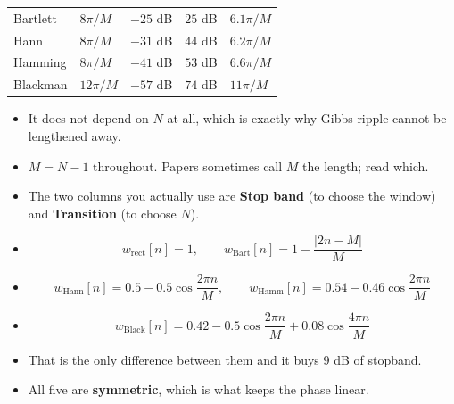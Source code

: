 {\begin{tabular}{@{}L{2.0cm}L{1.4cm}L{1.3cm}L{1.3cm}L{1.5cm}@{}}
Bartlett & $8\pi/M$ & $-25$ dB & $25$ dB & $6.1\pi/M$ \\
Hann & $8\pi/M$ & $-31$ dB & $44$ dB & $6.2\pi/M$ \\
Hamming & $8\pi/M$ & $-41$ dB & $53$ dB & $6.6\pi/M$ \\
Blackman & $12\pi/M$ & $-57$ dB & $74$ dB & $11\pi/M$ \\
\bottomrule
\end{tabular}
\par\smallskip
\begin{itemize}
  \item {} It does not depend
        on $N$ at all, which is exactly why Gibbs ripple cannot be lengthened away.
  \item $M=N-1$ throughout. Papers sometimes call $M$ the length; read which.
  \item The two columns you actually use are \textbf{Stop band} (to choose the window)
        and \textbf{Transition} (to choose $N$).
\end{itemize}}

\begin{itemize}
  \item[] \[ w_{\text{rect}}[n]=1,\qquad
             w_{\text{Bart}}[n]=1-\frac{|2n-M|}{M} \]
  \item[] \[ w_{\text{Hann}}[n]=0.5-0.5\cos\frac{2\pi n}{M},\qquad
             w_{\text{Hamm}}[n]=0.54-0.46\cos\frac{2\pi n}{M} \]
  \item[] \[ w_{\text{Black}}[n]=0.42-0.5\cos\frac{2\pi n}{M}
             +0.08\cos\frac{4\pi n}{M} \]
  \item {} That is the only difference
        between them and it buys 9 dB of stopband.
  \item All five are \textbf{symmetric}, which is what keeps the phase linear.
\end{itemize}

\hr


